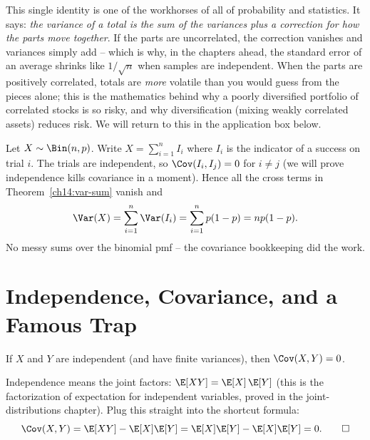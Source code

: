 \begin{aestheticbox}
This single identity is one of the workhorses of all of probability and statistics.
It says: \emph{the variance of a total is the sum of the variances plus a
correction for how the parts move together}. If the parts are uncorrelated, the
correction vanishes and variances simply add -- which is why, in the chapters
ahead, the standard error of an average shrinks like $1/\sqrt{n}$ when samples are
independent. When the parts are positively correlated, totals are \emph{more}
volatile than you would guess from the pieces alone; this is the mathematics behind
why a poorly diversified portfolio of correlated stocks is so risky, and why
diversification (mixing weakly correlated assets) reduces risk. We will return to
this in the application box below.
\end{aestheticbox}

\begin{example}
\label{ch14:ex-binom}
Let $X \sim \Bin(n, p)$. Write $X = \sum_{i=1}^n I_i$ where $I_i$ is the indicator
of a success on trial $i$. The trials are independent, so $\Cov(I_i, I_j) = 0$ for
$i \ne j$ (we will prove independence kills covariance in a moment). Hence all the
cross terms in Theorem~\ref{ch14:var-sum} vanish and
\[
\Var(X) = \sum_{i=1}^n \Var(I_i) = \sum_{i=1}^n p(1-p) = np(1-p).
\]
No messy sums over the binomial pmf -- the covariance bookkeeping did the work.
\end{example}

\section{Independence, Covariance, and a Famous Trap}
\label{ch14:indep}

\begin{theorem}
\label{ch14:indep-implies-zero}
If $X$ and $Y$ are independent (and have finite variances), then
$\Cov(X, Y) = 0$.
\end{theorem}

\begin{whybox}
Independence means the joint factors: $\E[XY] = \E[X]\,\E[Y]$ (this is the
factorization of expectation for independent variables, proved in the
joint-distributions chapter). Plug this straight into the shortcut formula:
\[
\Cov(X, Y) = \E[XY] - \E[X]\E[Y] = \E[X]\E[Y] - \E[X]\E[Y] = 0. \qedhere
\]
\end{whybox}

